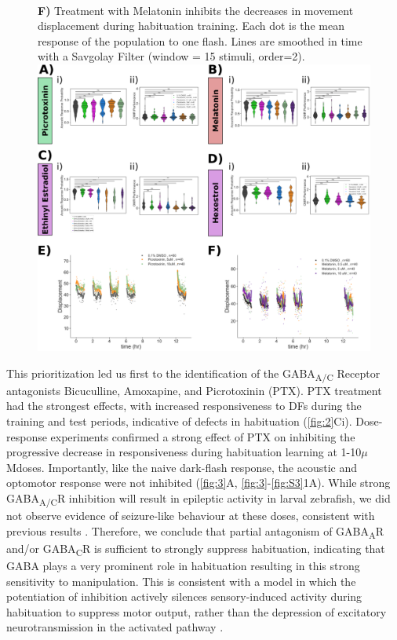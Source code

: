 \documentclass[9pt,lineno]{RandlettLab_elife}
\begin{document}
\begin{figure}
{\\ \textbf{F)} Treatment with Melatonin inhibits the decreases in movement displacement during habituation training. Each dot is the mean response of the population to one flash. Lines are smoothed in time with a Savgolay Filter (window = 15 stimuli, order=2).}{\includegraphics[width=14cm]{FigureS1_DrugBehavData_wDisp}}
\label{fig:S3}
\end{figure}


This prioritization led us first to the identification of the GABA\textsubscript{A/C} Receptor antagonists Bicuculline, Amoxapine, and Picrotoxinin (PTX). PTX treatment had the strongest effects, with increased responsiveness to DFs during the training and test periods, indicative of defects in habituation (\autoref{fig:2}Ci). Dose-response experiments confirmed a strong effect of PTX on inhibiting the progressive decrease in responsiveness during habituation learning at 1-10$\mu$Mdoses. Importantly, like the naive dark-flash response, the acoustic and optomotor response were not inhibited (\autoref{fig:3}A, \autoref{fig:3}-\autoref{fig:S3}1A). While strong GABA\textsubscript{A/C}R inhibition will result in epileptic activity in larval zebrafish, we did not observe evidence of seizure-like behaviour at these doses, consistent with previous results \cite{Bandara2020-nm}. Therefore, we conclude that partial antagonism of GABA\textsubscript{A}R and/or GABA\textsubscript{C}R is sufficient to strongly suppress habituation, indicating that GABA plays a very prominent role in habituation resulting in this strong sensitivity to manipulation. This is consistent with a model in which the potentiation of inhibition actively silences sensory-induced activity during habituation to suppress motor output, rather than the depression of excitatory neurotransmission in the activated pathway \cite{Cooke2020-mz, Ramaswami2014-du}. 
\end{document}
